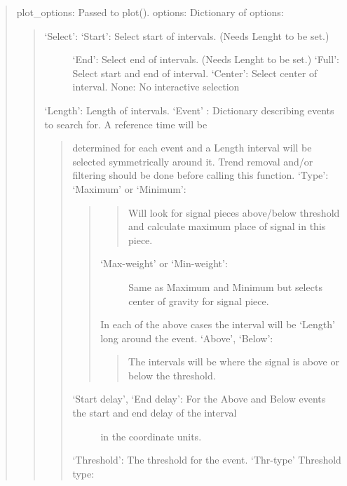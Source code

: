 \documentclass[letterpaper,10pt,english]{sphinxmanual}
\begin{document}
\begin{fulllineitems}
\begin{quote}
plot\_options: Passed to plot().
options: Dictionary of options:
\begin{quote}
\begin{description}
\item[{‘Select’: ‘Start’: Select start of intervals. (Needs Lenght to be set.)}] \leavevmode
‘End’: Select end of intervals. (Needs Lenght to be set.)
‘Full’: Select start and end of interval.
‘Center’: Select center of interval.
None: No interactive selection

\end{description}

‘Length’: Length of intervals.
‘Event’ : Dictionary describing events to search for. A reference time will be
\begin{quote}

determined for each event and a Length interval will be selected
symmetrically around it. Trend removal and/or filtering should be done
before calling this function.
‘Type’: ‘Maximum’ or ‘Minimum’:
\begin{quote}
\begin{quote}

Will look for signal pieces above/below threshold
and calculate maximum place of signal in this piece.
\end{quote}
\begin{description}
\item[{‘Max-weight’ or ‘Min-weight’:}] \leavevmode
Same as Maximum and Minimum but selects center of gravity
for signal piece.

\end{description}

In each of the above cases the interval will be ‘Length’ long around the event.
‘Above’, ‘Below’:
\begin{quote}

The intervals will be where the signal is above or below the threshold.
\end{quote}
\end{quote}
\begin{description}
\item[{‘Start delay’, ‘End delay’: For the Above and Below events the start and end delay of the interval}] \leavevmode
in the coordinate units.

\end{description}

‘Threshold’: The threshold for the event.
‘Thr-type’ Threshold type:
\begin{quote}


\end{quote}
\end{quote}
\end{quote}
\end{quote}
\end{fulllineitems}
\end{document}
